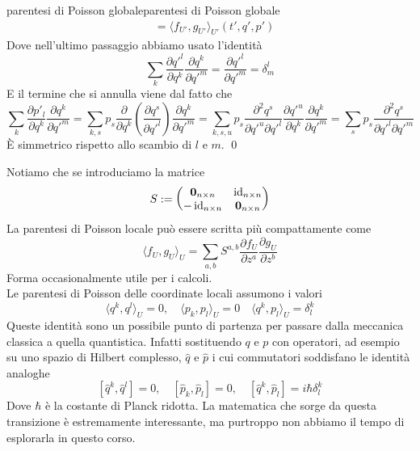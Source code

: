 \documentclass[openany]{book}
\begin{document}
\begin{proposition}{parentesi di Poisson globale}{parentesi di Poisson globale}
\begin{align*}
        & = \langle f_{U'}, g_{U'} \rangle_{U'}(t',q',p')
    \end{align*}
    Dove nell'ultimo passaggio abbiamo usato l'identità
    \[ \sum_k \frac{\partial q'^l}{\partial q^k}\frac{\partial q^k}{\partial q'^m} = \frac{\partial q'^l}{\partial q'^m} = \delta_m^l \]
    E il termine che si annulla viene dal fatto che
    \[\sum_k \frac{\partial p'_l}{\partial q^k}\frac{\partial q^k}{\partial q'^m} = \sum_{k,s} p_s \frac{\partial}{\partial q^k}\left( \frac{\partial q^s}{\partial q'^l} \right)\frac{\partial q^k}{\partial q'^m} = \sum_{k,s,u} p_s \frac{\partial^2 q^s}{\partial q'^u \partial q'^l}\frac{ \partial q'^u}{\partial q^k}\frac{\partial q^k}{\partial q'^m} = \sum_s p_s \frac{ \partial^2 q^s }{\partial q'^l \partial q'^m}\]
    È simmetrico rispetto allo scambio di $l$ e $m$.
    \qed
\end{proposition}

Notiamo che se introduciamo la matrice 
\[ S := \begin{pmatrix}
    \mathbf{0}_{n\times n} & \operatorname{id}_{n\times n} \\ - \operatorname{id}_{n\times n} & \mathbf{0}_{n\times n}
\end{pmatrix} \]
La parentesi di Poisson locale può essere scritta più compattamente come 
\[ \langle f_U, g_U \rangle_U = \sum_{a,b} S^{a,b} \frac{\partial f_U}{\partial z^a}\frac{\partial g_U}{\partial z^b} \]
Forma occasionalmente utile per i calcoli.\\
Le parentesi di Poisson delle coordinate locali assumono i valori 
\[ \langle q^k, q^l \rangle_U = 0,\quad \langle p_k, p_l\rangle_U = 0 \quad \langle q^k, p_l\rangle_U = \delta_l^k  \]
Queste identità sono un possibile punto di partenza per passare dalla meccanica classica a quella quantistica. Infatti sostituendo $q$ e $p$ con operatori, ad esempio su uno spazio di Hilbert complesso, $\hat q$ e $\hat p$ i cui commutatori soddisfano le identità analoghe
\[ [\hat q^k, \hat q^l]= 0,\quad [\hat p_k, \hat p_l] = 0,\quad [\hat q^k,\hat p_l] = i\hbar \delta_l^k  \]
Dove $\hbar$ è la costante di Planck ridotta. La matematica che sorge da questa transizione è estremamente interessante, ma purtroppo non abbiamo il tempo di esplorarla in questo corso.
\end{document}
